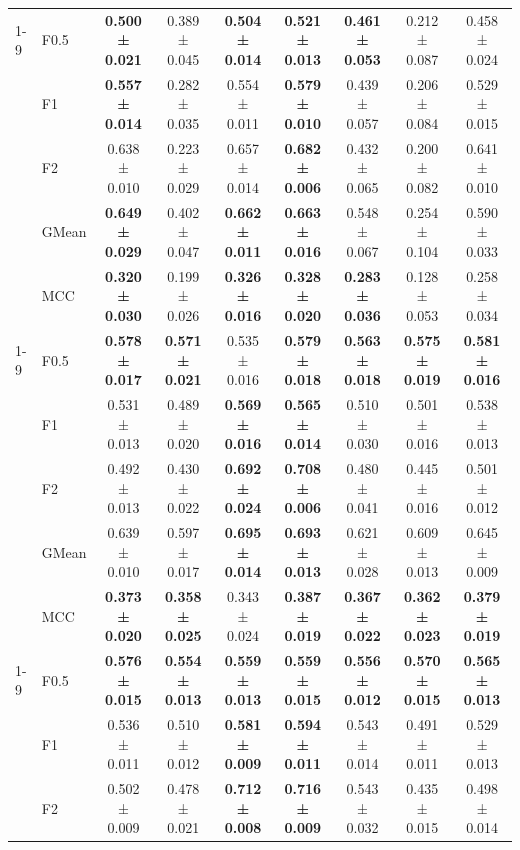 \begin{table}[H]
{\begin{tabular}{llccccccc}
\cline{1-9}
\multirow[t]{5}{*}{GaussianNB} & F0.5 & \textbf{0.500 ± 0.021} & 0.389 ± 0.045 & \textbf{0.504 ± 0.014} & \textbf{0.521 ± 0.013} & \textbf{0.461 ± 0.053} & 0.212 ± 0.087 & 0.458 ± 0.024 \\
 & F1 & \textbf{0.557 ± 0.014} & 0.282 ± 0.035 & 0.554 ± 0.011 & \textbf{0.579 ± 0.010} & 0.439 ± 0.057 & 0.206 ± 0.084 & 0.529 ± 0.015 \\
 & F2 & 0.638 ± 0.010 & 0.223 ± 0.029 & 0.657 ± 0.014 & \textbf{0.682 ± 0.006} & 0.432 ± 0.065 & 0.200 ± 0.082 & 0.641 ± 0.010 \\
 & GMean & \textbf{0.649 ± 0.029} & 0.402 ± 0.047 & \textbf{0.662 ± 0.011} & \textbf{0.663 ± 0.016} & 0.548 ± 0.067 & 0.254 ± 0.104 & 0.590 ± 0.033 \\
 & MCC & \textbf{0.320 ± 0.030} & 0.199 ± 0.026 & \textbf{0.326 ± 0.016} & \textbf{0.328 ± 0.020} & \textbf{0.283 ± 0.036} & 0.128 ± 0.053 & 0.258 ± 0.034 \\
\cline{1-9}
\multirow[t]{5}{*}{LGBM()} & F0.5 & \textbf{0.578 ± 0.017} & \textbf{0.571 ± 0.021} & 0.535 ± 0.016 & \textbf{0.579 ± 0.018} & \textbf{0.563 ± 0.018} & \textbf{0.575 ± 0.019} & \textbf{0.581 ± 0.016} \\
 & F1 & 0.531 ± 0.013 & 0.489 ± 0.020 & \textbf{0.569 ± 0.016} & \textbf{0.565 ± 0.014} & 0.510 ± 0.030 & 0.501 ± 0.016 & 0.538 ± 0.013 \\
 & F2 & 0.492 ± 0.013 & 0.430 ± 0.022 & \textbf{0.692 ± 0.024} & \textbf{0.708 ± 0.006} & 0.480 ± 0.041 & 0.445 ± 0.016 & 0.501 ± 0.012 \\
 & GMean & 0.639 ± 0.010 & 0.597 ± 0.017 & \textbf{0.695 ± 0.014} & \textbf{0.693 ± 0.013} & 0.621 ± 0.028 & 0.609 ± 0.013 & 0.645 ± 0.009 \\
 & MCC & \textbf{0.373 ± 0.020} & \textbf{0.358 ± 0.025} & 0.343 ± 0.024 & \textbf{0.387 ± 0.019} & \textbf{0.367 ± 0.022} & \textbf{0.362 ± 0.023} & \textbf{0.379 ± 0.019} \\
\cline{1-9}
\multirow[t]{5}{*}{LogisticRegression()} & F0.5 & \textbf{0.576 ± 0.015} & \textbf{0.554 ± 0.013} & \textbf{0.559 ± 0.013} & \textbf{0.559 ± 0.015} & \textbf{0.556 ± 0.012} & \textbf{0.570 ± 0.015} & \textbf{0.565 ± 0.013} \\
 & F1 & 0.536 ± 0.011 & 0.510 ± 0.012 & \textbf{0.581 ± 0.009} & \textbf{0.594 ± 0.011} & 0.543 ± 0.014 & 0.491 ± 0.011 & 0.529 ± 0.013 \\
 & F2 & 0.502 ± 0.009 & 0.478 ± 0.021 & \textbf{0.712 ± 0.008} & \textbf{0.716 ± 0.009} & 0.543 ± 0.032 & 0.435 ± 0.015 & 0.498 ± 0.014 \\

\end{tabular}}
\end{table}
